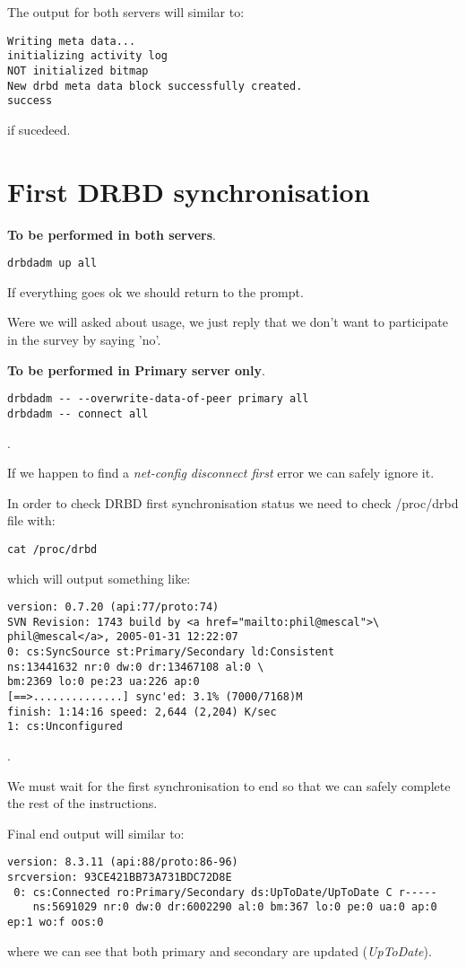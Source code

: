 The output for both servers will similar to:
\begin{verbatim}
Writing meta data...
initializing activity log
NOT initialized bitmap
New drbd meta data block successfully created.
success
\end{verbatim}
if sucedeed.

\section {First DRBD synchronisation}
\textbf{To be performed in both servers}.
\begin{verbatim}
drbdadm up all
\end{verbatim}
If everything goes ok we should return to the prompt.

Were we will asked about usage, we just reply that we don't want to participate in the survey by saying 'no'.

\textbf{To be performed in Primary server only}.
\begin{verbatim}
drbdadm -- --overwrite-data-of-peer primary all
drbdadm -- connect all
\end{verbatim}
.

If we happen to find a \textit{net-config disconnect first} error we can safely ignore it.

In order to check DRBD first synchronisation status we need to check /proc/drbd file with:
\begin{verbatim}
cat /proc/drbd
\end{verbatim}
which will output something like:
\begin{verbatim}
version: 0.7.20 (api:77/proto:74)
SVN Revision: 1743 build by <a href="mailto:phil@mescal">\
phil@mescal</a>, 2005-01-31 12:22:07
0: cs:SyncSource st:Primary/Secondary ld:Consistent
ns:13441632 nr:0 dw:0 dr:13467108 al:0 \
bm:2369 lo:0 pe:23 ua:226 ap:0
[==>..............] sync'ed: 3.1% (7000/7168)M
finish: 1:14:16 speed: 2,644 (2,204) K/sec
1: cs:Unconfigured
\end{verbatim}
.

We must wait for the first synchronisation to end so that we can safely complete the rest of the instructions.

Final end output will similar to:
\begin{verbatim}
version: 8.3.11 (api:88/proto:86-96)
srcversion: 93CE421BB73A731BDC72D8E 
 0: cs:Connected ro:Primary/Secondary ds:UpToDate/UpToDate C r-----
    ns:5691029 nr:0 dw:0 dr:6002290 al:0 bm:367 lo:0 pe:0 ua:0 ap:0 ep:1 wo:f oos:0
\end{verbatim}
where we can see that both primary and secondary are updated (\textit{UpToDate}).
